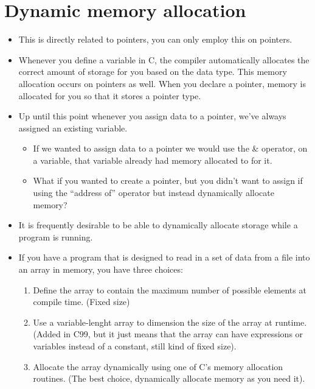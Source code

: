 \section{Dynamic memory allocation}
\begin{itemize}
    \item This is directly related to pointers, you can only employ this on pointers. 
    \item Whenever you define a variable in C, the compiler automatically allocates the correct amount of storage for you based on the data type. This memory allocation occurs on pointers as well. When you declare a pointer, memory is allocated for you so that it stores a pointer type. 
    \item Up until this point whenever you assign data to a pointer, we've always assigned an existing variable. 
        \begin{itemize}
            \item If we wanted to assign data to a pointer we would use the \& operator, on a variable, that variable already had memory allocated to for it.
            \item What if you wanted to create a pointer, but you didn't want to assign if using the ``address of'' operator but instead dynamically allocate memory? 
        \end{itemize}
    
    \item It is frequently desirable to be able to dynamically allocate storage while a program is running. 
    \item If you have a program that is designed to read in a set of data from a file into an array in memory, you have three choices:
        \begin{enumerate}
            \item Define the array to contain the maximum number of possible elements at compile time. (Fixed size)
            \item Use a variable-lenght array to dimension the size of the array at runtime. (Added in C99, but it just means that the array can have expressions or variables instead of a constant, still kind of fixed size). 
            \item Allocate the array dynamically using one of C's memory allocation routines. (The best choice, dynamically allocate memory as you need it). 
        \end{enumerate}
    

\end{itemize}
